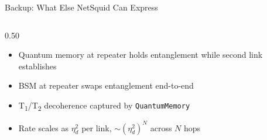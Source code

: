 \documentclass[10pt]{beamer}
\begin{document}
\begin{frame}{Backup: What Else NetSquid Can Express}
\begin{columns}[T]
\begin{column}{0.50\textwidth}
\begin{center}
\begin{tikzpicture}[every node/.style={font=\scriptsize}, scale=0.78]
            \end{tikzpicture}
            \end{center}
            \begin{itemize}\scriptsize
                \item Quantum memory at repeater holds entanglement while second link establishes
                \item BSM at repeater swaps entanglement end-to-end
                \item T\textsubscript{1}/T\textsubscript{2} decoherence captured by \texttt{QuantumMemory}
                \item Rate scales as $\eta_d^2$ per link, $\sim(\eta_d^2)^N$ across $N$ hops
            \end{itemize}
        \end{column}
    \end{columns}
\end{frame}
\end{document}

